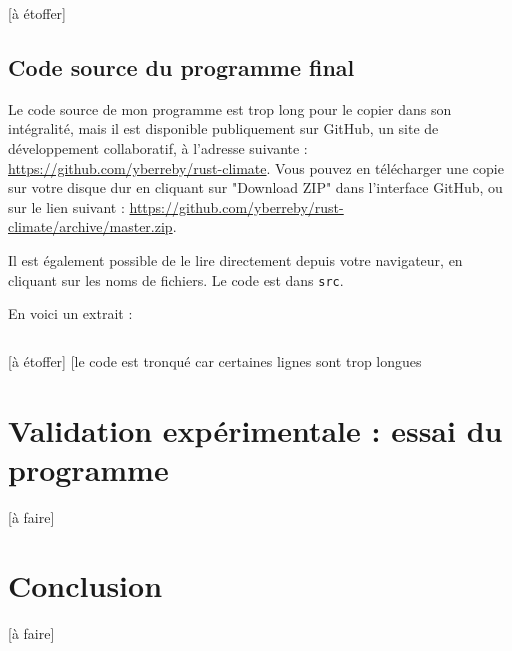 \documentclass[12pt]{article}
\begin{document}
[à étoffer]

\subsection{Code source du programme final}
Le code source de mon programme est trop long pour le copier dans son intégralité, mais il est disponible publiquement sur GitHub, un site de développement collaboratif, à l'adresse suivante : \url{https://github.com/yberreby/rust-climate}. Vous pouvez en télécharger une copie sur votre disque dur en cliquant sur "Download ZIP" dans l'interface GitHub, ou sur le lien suivant : \url{https://github.com/yberreby/rust-climate/archive/master.zip}.

Il est également possible de le lire directement depuis votre navigateur, en cliquant sur les noms de fichiers. Le code est dans \texttt{src}.

En voici un extrait :

\inputminted[linenos]{rust}{temperature.rs}

[à étoffer]
[le code est tronqué car certaines lignes sont trop longues

\clearpage
\section{Validation expérimentale : essai du programme}

[à faire]

\clearpage
\section{Conclusion}

[à faire]
\end{document}
